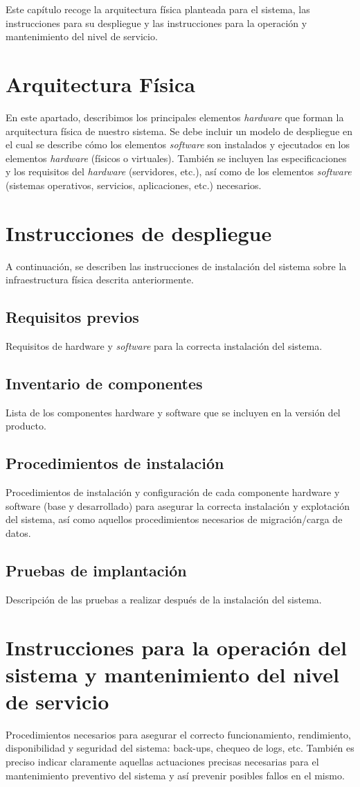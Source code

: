 Este capítulo recoge la arquitectura física planteada para el sistema, las instrucciones para su despliegue y las instrucciones para la operación y mantenimiento del nivel de servicio.

\section{Arquitectura Física}
En este apartado, describimos los principales elementos \textit{hardware} que forman la arquitectura física de nuestro sistema. Se debe incluir un modelo de despliegue en el cual se describe cómo los elementos \textit{software} son instalados y ejecutados en los elementos \textit{hardware} (físicos o virtuales). También se incluyen las especificaciones y los requisitos del \textit{hardware} (servidores, etc.), así como de los elementos \textit{software} (sistemas operativos, servicios, aplicaciones, etc.) necesarios.

\section{Instrucciones de despliegue}
A continuación, se describen las instrucciones de instalación del sistema sobre la infraestructura física descrita anteriormente.

\subsection{Requisitos previos}
Requisitos de hardware y \textit{software} para la correcta instalación del sistema.

\subsection{Inventario de componentes}
Lista de los componentes hardware y software que se incluyen en la versión del producto.

\subsection{Procedimientos de instalación}
Procedimientos de instalación y configuración de cada componente hardware y software (base y desarrollado) para asegurar la correcta instalación y explotación del sistema, así como aquellos procedimientos necesarios de migración/carga de datos.

\subsection{Pruebas de implantación}
Descripción de las pruebas a realizar después de la instalación del sistema. 

\section{Instrucciones para la operación del sistema y mantenimiento del nivel de servicio}
Procedimientos necesarios para asegurar el correcto funcionamiento, rendimiento, disponibilidad y seguridad del sistema: back-ups, chequeo de logs, etc. También es preciso indicar claramente aquellas actuaciones precisas necesarias para el mantenimiento preventivo del sistema y así prevenir posibles fallos en el mismo. 